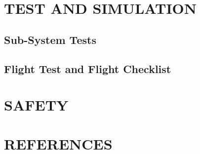 \documentclass[12pt]{article}
\begin{document}
\section{TEST AND SIMULATION}
\subsection{Sub-System Tests}
\subsection{Flight Test and Flight Checklist}

\section{SAFETY}

\section{REFERENCES}

\singlespacing
 

\end{document}
